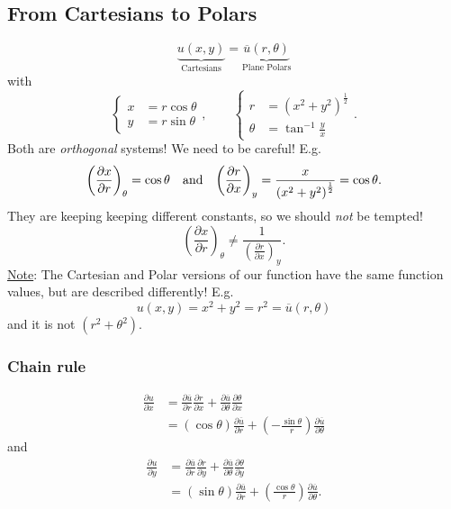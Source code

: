 \documentclass[12pt]{report}
\theoremstyle{definition}
\begin{document}
\subsection{From Cartesians to Polars}
\[
    \underbrace{u(x,y)}_\text{Cartesians} = \underbrace{\overline{u}(r,\theta)}_\text{Plane Polars}
\]with\[
    \left\{\begin{align*}
            x & = r\cos{\theta} \\
            y & = r\sin{\theta}
    \end{align*}\right.,\qquad \left\{\begin{align*}
            r & = {(x^{2} + y^{2})}^{\frac{1}{2}} \\
            \theta & = \tan^{-1}{\frac{y}{x}}
    \end{align*}\right..
\]
Both are \emph{orthogonal} systems!
We need to be careful! E.g.\[
    {\left(\frac{\partial x}{\partial r} \right)}_{\theta} = \cos{\theta} \quad\textnormal{and}\quad
    {\left(\frac{\partial r}{\partial x} \right)}_{y} = \frac{x}{{(x^{2} + y^{2})}^{\frac{1}{2}}} = \cos{\theta}.
\]
They are keeping keeping different constants, so we should \emph{not} be tempted! \[
    {\left(\frac{\partial x}{\partial r} \right)}_{\theta} \neq
    \frac{1}{{\left(\frac{\partial r}{\partial x} \right)}_{y}}.
\]
\underline{Note}: The Cartesian and Polar versions of our function
have the same function values, but are described differently! E.g.\[
    u(x,y) = x^{2}+y^{2} = r^{2} = \overline{u}(r,\theta)
\]and it is not $(r^{2} + \theta^{2})$.

\subsubsection{Chain rule}

\[
    \begin{align*}
        \frac{\partial u}{\partial x} & = \frac{\partial \overline{u}}{\partial r} \frac{\partial r}{\partial x}
        + \frac{\partial \overline{u}}{\partial \theta} \frac{\partial\theta}{\partial x} \\
                                      & = (\cos{\theta})\frac{\partial \overline{u}}{\partial r}
                                      + \left(-\frac{\sin{\theta}}{r}\right) \frac{\partial \overline{u}}{\partial \theta}
    \end{align*}
\]and\[
    \begin{align*}
        \frac{\partial u}{\partial y} & = \frac{\partial \overline{u}}{\partial r} \frac{\partial r}{\partial y}
        + \frac{\partial \overline{u}}{\partial \theta} \frac{\partial\theta}{\partial y} \\
                                      & = (\sin{\theta})\frac{\partial \overline{u}}{\partial r} 
                                      + \left(\frac{\cos{\theta}}{r}\right) \frac{\partial \overline{u}}{\partial \theta}.
    \end{align*}
\]
\end{document}
